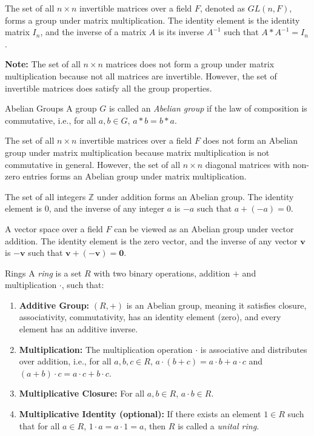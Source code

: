 \documentclass[openany]{book}
\begin{document}
\begin{example}
    The set of all $n \times n$ invertible matrices over a field $F$, denoted as $GL(n, F)$, forms a group under matrix multiplication. The identity element is the identity matrix $I_n$, and the inverse of a matrix $A$ is its inverse $A^{-1}$ such that $A * A^{-1} = I_n$. 
    \begin{mynote}
    \textbf{Note:} The set of all $n \times n$ matrices does not form a group under matrix multiplication because not all matrices are invertible. However, the set of invertible matrices does satisfy all the group properties.
    \end{mynote}
\end{example}
\begin{mydefinition}
{Abelian Groups}
A group $G$ is called an \emph{Abelian group} if the law of composition is commutative, i.e., for all $a, b \in G$, $a * b = b * a$.
\end{mydefinition}
\begin{example}
    The set of all $n \times n$ invertible matrices over a field $F$ does not form an Abelian group under matrix multiplication because matrix multiplication is not commutative in general. However, the set of all $n \times n$ diagonal matrices with non-zero entries forms an Abelian group under matrix multiplication.
\end{example}
\begin{example}
    The set of all integers $\mathbb{Z}$ under addition forms an Abelian group. The identity element is $0$, and the inverse of any integer $a$ is $-a$ such that $a + (-a) = 0$.   
\end{example}
\begin{example}
    A vector space over a field $F$ can be viewed as an Abelian group under vector addition. The identity element is the zero vector, and the inverse of any vector $\mathbf{v}$ is $-\mathbf{v}$ such that $\mathbf{v} + (-\mathbf{v}) = \mathbf{0}$.
\end{example}
\begin{mydefinition}{Rings}
A \emph{ring} is a set $R$ with two binary operations, addition $+$ and multiplication $\cdot$, such that:
\begin{enumerate}
    \item \textbf{Additive Group:} $(R, +)$ is an Abelian group, meaning it satisfies closure, associativity, commutativity, has an identity element (zero), and every element has an additive inverse.
    \item \textbf{Multiplication:} The multiplication operation $\cdot$ is associative and distributes over addition, i.e., for all $a, b, c \in R$, $a \cdot (b + c) = a \cdot b + a \cdot c$ and $(a + b) \cdot c = a \cdot c + b \cdot c$.
    \item \textbf{Multiplicative Closure:} For all $a, b \in R$, $a \cdot b \in R$.
    \item \textbf{Multiplicative Identity (optional):} If there exists an element $1 \in R$ such that for all $a \in R$, $1 \cdot a = a \cdot 1 = a$, then $R$ is called a \emph{unital ring}.
\end{enumerate}
\end{mydefinition}
\end{document}

